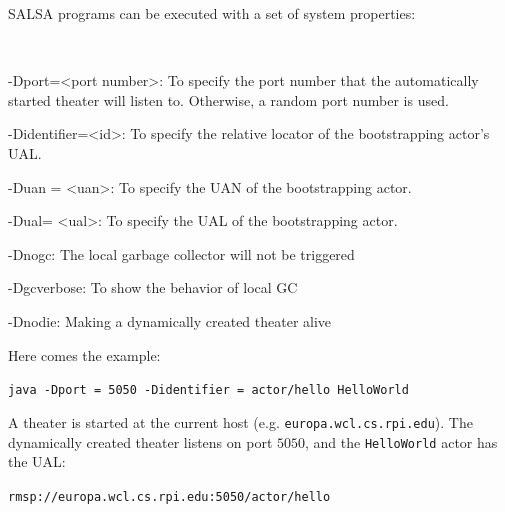 	{SALSA programs can be executed with a set of system properties:
	  {\tt
		\begin{description}
		\item -Dport=<port number>: To specify the port number that the 
                 automatically started theater will listen to. Otherwise, a random port number is used.
		\item -Didentifier=<id>: To specify the relative locator of the bootstrapping actor's UAL.
		\item -Duan = <uan>: To specify the UAN of the bootstrapping actor.
		\item -Dual= <ual>: To specify the UAL of the bootstrapping actor.
		\item -Dnogc: The local garbage collector will not be triggered
		\item -Dgcverbose: To show the behavior of local GC
		\item -Dnodie: Making a dynamically created theater alive
		\end{description}
	  }
	}
    {
		Here comes the example: \begin{description}
		\item {\tt java -Dport = 5050 -Didentifier = actor/hello HelloWorld}
		\end{description}
	}
    {
		A theater is started at the current host (e.g. {\tt europa.wcl.cs.rpi.edu}).
		The dynamically created theater listens on port $5050$, and 
		the {\tt HelloWorld} actor has the UAL:  \begin{description}
		\item {\tt rmsp://europa.wcl.cs.rpi.edu:5050/actor/hello}
		\end{description}
	}

